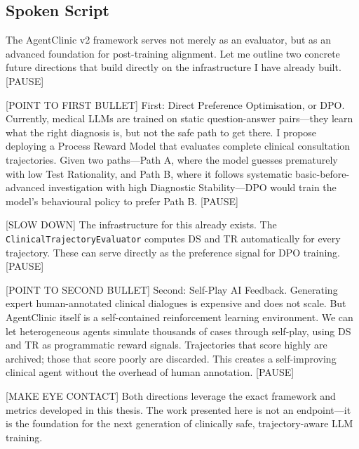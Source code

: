 \documentclass[12pt]{article}
\begin{document}
  \subsection*{Spoken Script}
  \begin{spokenbox}
   The AgentClinic v2 framework serves not merely as an evaluator, but as an advanced foundation for post-training alignment. Let me outline two concrete future directions that build directly on the infrastructure I have already built. [PAUSE]

  [POINT TO FIRST BULLET] First: Direct Preference Optimisation, or DPO. Currently, medical LLMs are trained on static question-answer pairs---they learn what the right diagnosis is, but not the safe path to get there. I propose deploying a Process Reward Model that evaluates complete clinical consultation trajectories. Given two paths---Path A, where the model guesses prematurely with low Test Rationality, and Path B, where it follows systematic basic-before-advanced investigation with high Diagnostic Stability---DPO would train the model's behavioural policy to prefer Path B. [PAUSE]

  [SLOW DOWN] The infrastructure for this already exists. The \texttt{ClinicalTrajectoryEvaluator} computes DS and TR automatically for every trajectory. These can serve directly as the preference signal for DPO training. [PAUSE]

  [POINT TO SECOND BULLET] Second: Self-Play AI Feedback. Generating expert human-annotated clinical dialogues is expensive and does not scale. But AgentClinic itself is a self-contained reinforcement learning environment. We can let heterogeneous agents simulate thousands of cases through self-play, using DS and TR as programmatic reward signals. Trajectories that score highly are archived; those that score poorly are discarded. This creates a self-improving clinical agent without the overhead of human annotation. [PAUSE]

  [MAKE EYE CONTACT] Both directions leverage the exact framework and metrics developed in this thesis. The work presented here is not an endpoint---it is the foundation for the next generation of clinically safe, trajectory-aware LLM training.
  \end{spokenbox}
\end{document}
